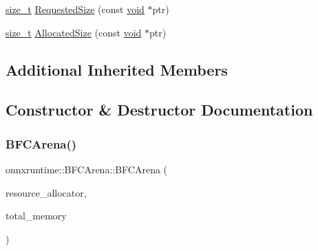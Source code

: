 \begin{DoxyCompactItemize}
\item 
\mbox{\hyperlink{mlasi_8h_a503efbc1c6e50825320ad909366b78ab}{size\+\_\+t}} \mbox{\hyperlink{classonnxruntime_1_1BFCArena_aca9445e29fe31c6a715b249021f9a296}{Requested\+Size}} (const \mbox{\hyperlink{mlasi_8h_a88f941d423cb2a819b70a1358982b1a6}{void}} $\ast$ptr)
\item 
\mbox{\hyperlink{mlasi_8h_a503efbc1c6e50825320ad909366b78ab}{size\+\_\+t}} \mbox{\hyperlink{classonnxruntime_1_1BFCArena_a290c11e641ab3a5af5bb8c6c1c06008a}{Allocated\+Size}} (const \mbox{\hyperlink{mlasi_8h_a88f941d423cb2a819b70a1358982b1a6}{void}} $\ast$ptr)
\end{DoxyCompactItemize}
\subsection*{Additional Inherited Members}


\subsection{Constructor \& Destructor Documentation}
\mbox{\label{classonnxruntime_1_1BFCArena_aa8ed4d9dbe83542b0d1a97050edc9fe5}} 
\subsubsection{\texorpdfstring{B\+F\+C\+Arena()}{BFCArena()}}
{\footnotesize\ttfamily onnxruntime\+::\+B\+F\+C\+Arena\+::\+B\+F\+C\+Arena (\begin{DoxyParamCaption}\item[{std\+::unique\+\_\+ptr$<$ \mbox{\hyperlink{classonnxruntime_1_1IDeviceAllocator}{I\+Device\+Allocator}} $>$}]{resource\+\_\+allocator,  }\item[{\mbox{\hyperlink{mlasi_8h_a503efbc1c6e50825320ad909366b78ab}{size\+\_\+t}}}]{total\+\_\+memory }\end{DoxyParamCaption})}

\mbox{\label{classonnxruntime_1_1BFCArena_ac4d8fcafd40fdc8bbb211cbb8fdd1521}} 

